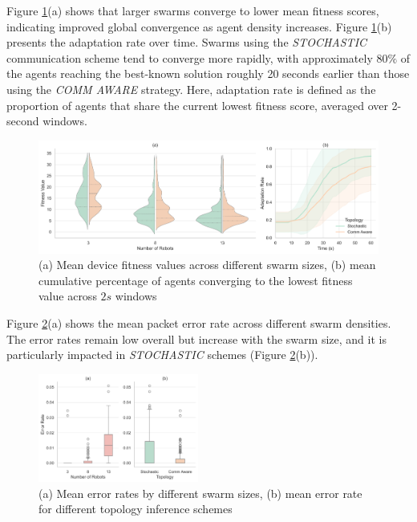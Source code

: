 \documentclass[conference]{IEEEtran}
\begin{document}
Figure \ref{fig:performance}(a) shows that larger swarms converge to lower mean fitness scores, indicating improved global convergence as agent density increases. Figure \ref{fig:performance}(b) presents the adaptation rate over time. Swarms using the \emph{STOCHASTIC} communication scheme tend to converge more rapidly, with approximately $80\%$ of the agents reaching the best-known solution roughly 20 seconds earlier than those using the \emph{COMM AWARE} strategy. Here, adaptation rate is defined as the proportion of agents that share the current lowest fitness score, averaged over 2-second windows.

\begin{figure}[h]
    \centering
    \includegraphics[width=1\textwidth]{performance_impact.pdf}
    \caption{(a) Mean device fitness values across different swarm sizes, (b) mean cumulative percentage of agents converging to the lowest fitness value across $2s$ windows}
    \label{fig:performance}
\end{figure}

Figure \ref{fig:error-rates}(a) shows the mean packet error rate across different swarm densities. The error rates remain low overall but increase with the swarm size, and it is particularly impacted in \emph{STOCHASTIC} schemes (Figure \ref{fig:error-rates}(b)).

\begin{figure}[h]
    \centering
    \includegraphics[width=0.47\textwidth]{reliability_impact.pdf}
    \caption{(a) Mean error rates by different swarm sizes, (b) mean error rate for different topology inference schemes}
    \label{fig:error-rates}
\end{figure}
\end{document}
